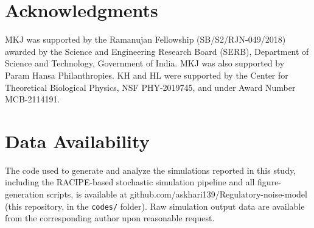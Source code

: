 \documentclass[11pt]{article}
\begin{document}



\section{Acknowledgments}

MKJ was supported by the Ramanujan Fellowship (SB/S2/RJN-049/2018) awarded by the Science and Engineering Research Board (SERB), Department of Science and Technology, Government of India. MKJ was also supported by Param Hansa Philanthropies. KH and HL were supported by the Center for Theoretical Biological Physics, NSF PHY-2019745, and under Award Number MCB-2114191.

\section{Data Availability}

The code used to generate and analyze the simulations reported in this study, including the RACIPE-based stochastic simulation pipeline and all figure-generation scripts, is available at github.com/askhari139/Regulatory-noise-model (this repository, in the \texttt{codes/} folder). Raw simulation output data are available from the corresponding author upon reasonable request.
\end{document}
